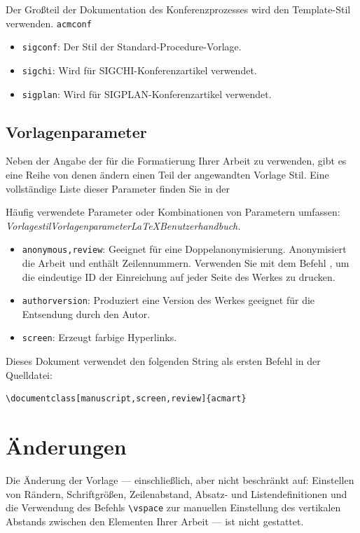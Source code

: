 \documentclass[manuscript,screen,review]{acmart}
\begin{document}
Der Großteil der Dokumentation des Konferenzprozesses wird den Template-Stil verwenden.
{\verb|acmconf|}\begin{itemize}
\item {\texttt{sigconf}}: Der Stil der Standard-Procedure-Vorlage.
\item{\texttt{sigchi}}: Wird für SIGCHI-Konferenzartikel verwendet.
\item{\texttt{sigplan}}: Wird für SIGPLAN-Konferenzartikel verwendet.
\end{itemize}

\subsection{Vorlagenparameter}

Neben der Angabe der für die Formatierung Ihrer Arbeit zu verwenden, gibt es eine Reihe von denen ändern einen Teil der angewandten Vorlage Stil. Eine vollständige Liste dieser Parameter finden Sie in der

Häufig verwendete Parameter oder Kombinationen von Parametern umfassen:
{\itshape Vorlagestil}{\itshape Vorlagenparameter}{\itshape \LaTeX Benutzerhandbuch.}\begin{itemize}
\item {\texttt{anonymous,review}}: Geeignet für eine Doppelanonymisierung. Anonymisiert die Arbeit und enthält Zeilennummern. Verwenden Sie mit dem Befehl \texttt{\string\acmSubmissionID}, um die eindeutige ID der Einreichung auf jeder Seite des Werkes zu drucken.
\item{\texttt{authorversion}}: Produziert eine Version des Werkes geeignet für die Entsendung durch den Autor.
\item{\texttt{screen}}: Erzeugt farbige Hyperlinks.
\end{itemize}

Dieses Dokument verwendet den folgenden String als ersten Befehl in der Quelldatei:
\begin{verbatim}
\documentclass[manuscript,screen,review]{acmart}
\end{verbatim}

\section{Änderungen}

Die Änderung der Vorlage — einschließlich, aber nicht beschränkt auf: Einstellen von Rändern, Schriftgrößen, Zeilenabstand, Absatz- und Listendefinitionen und die Verwendung des Befehls \verb|\vspace| zur manuellen Einstellung des vertikalen Abstands zwischen den Elementen Ihrer Arbeit — ist nicht gestattet.
\end{document}

